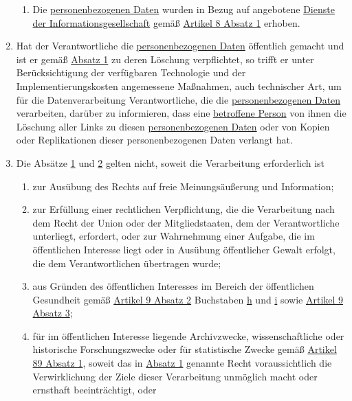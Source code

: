 \begin{enumerate}
\begin{enumerate}
    \item Die \hyperref[itm:04-1]{personenbezogenen Daten} wurden in Bezug auf angebotene \hyperref[itm:04-28]{Dienste der Informationsgesellschaft} gemäß
     \hyperref[itm:08-1]{Artikel 8 Absatz 1} erhoben.
    \label{itm:17-1f}

  \end{enumerate}

  \item Hat der Verantwortliche die \hyperref[itm:04-1]{personenbezogenen Daten} öffentlich gemacht und ist er gemäß \hyperref[itm:17-1]
   {Absatz 1} zu deren Löschung verpflichtet, so trifft er unter Berücksichtigung der verfügbaren Technologie und der
   Implementierungskosten angemessene Maßnahmen, auch technischer Art, um für die Datenverarbeitung Verantwortliche,
   die die \hyperref[itm:04-1]{personenbezogenen Daten} verarbeiten, darüber zu informieren, dass eine \hyperref[itm:04-1]{betroffene Person} von ihnen die
   Löschung aller Links zu diesen \hyperref[itm:04-1]{personenbezogenen Daten} oder von Kopien oder Replikationen dieser personenbezogenen
   Daten verlangt hat.
  \label{itm:17-2}

  \item Die Absätze \hyperref[itm:17-1]{1} und \hyperref[itm:17-2]{2} gelten nicht, soweit die Verarbeitung erforderlich
   ist
  \label{itm:17-3}

  \begin{enumerate}
  
    \item zur Ausübung des Rechts auf freie Meinungsäußerung und Information;
    \label{itm:17-3a}

    \item zur Erfüllung einer rechtlichen Verpflichtung, die die Verarbeitung nach dem Recht der Union oder der
     Mitgliedstaaten, dem der Verantwortliche unterliegt, erfordert, oder zur Wahrnehmung einer Aufgabe, die im
     öffentlichen Interesse liegt oder in Ausübung öffentlicher Gewalt erfolgt, die dem Verantwortlichen übertragen
     wurde;
    \label{itm:17-3b}

    \item aus Gründen des öffentlichen Interesses im Bereich der öffentlichen Gesundheit gemäß \hyperref[itm:09-2]
     {Artikel 9 Absatz 2} Buchstaben \hyperref[itm:09-2h]{h} und \hyperref[itm:09-2i]{i} sowie \hyperref[itm:09-3]
     {Artikel 9 Absatz 3};
    \label{itm:17-3c}

    \item für im öffentlichen Interesse liegende Archivzwecke, wissenschaftliche oder historische Forschungszwecke oder
     für statistische Zwecke gemäß \hyperref[itm:89-1]{Artikel 89 Absatz 1}, soweit das in \hyperref[itm:17-1]
     {Absatz 1} genannte Recht voraussichtlich die Verwirklichung der Ziele dieser Verarbeitung unmöglich macht oder
     ernsthaft beeinträchtigt, oder
    \label{itm:17-3d}


\end{enumerate}
\end{enumerate}

